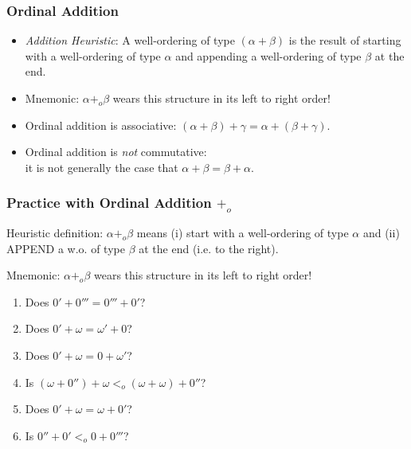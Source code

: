\begin{frame}
\frametitle{Ordinal Addition}

\begin{itemize}[<+->]

\item \emph{Addition Heuristic}: A well-ordering of type $(\alpha+\beta)$ is the result of starting with a well-ordering of type $\alpha$ and appending a well-ordering of type $\beta$ at the end.

\item Mnemonic: $\alpha +_o \beta$ wears this structure in its left to right order! 

\item Ordinal addition is associative: \((\alpha+\beta)+\gamma = \alpha+(\beta+\gamma)\).

\item Ordinal addition is \emph{not} commutative: \\ it is not generally the case that $\alpha + \beta = \beta + \alpha$.

\end{itemize}
\end{frame}


\begin{frame}
\frametitle{Practice with Ordinal Addition $+_o$}

Heuristic definition: $\alpha +_o \beta$ means (i) start with a well-ordering of type $\alpha$ and (ii) APPEND a w.o. of type $\beta$ at the end (i.e. to the right). 

Mnemonic: $\alpha +_o \beta$ wears this structure in its left to right order! 

\begin{enumerate}[<+->]

\item Does \(0' + 0''' = 0''' + 0'\)? 

\item Does \(0' + \omega = \omega' + 0\)? 

\item Does \(0' + \omega = 0 + \omega'\)?

\item Is \((\omega + 0'') + \omega <_o (\omega + \omega) + 0''\)? 

\item Does \(0' + \omega = \omega + 0'\)?

\item Is $0'' + 0' <_o 0 + 0''' $? 

\end{enumerate}
\end{frame}

